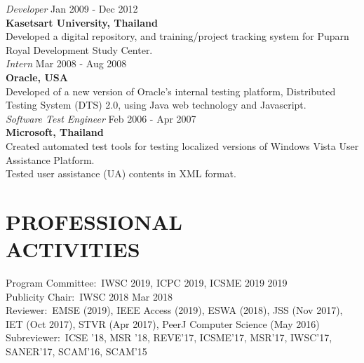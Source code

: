 \documentclass[margin, 10pt]{res} %
\begin{document}
\begin{resume}
{\sl Developer} \hfill Jan 2009 - Dec 2012 \\
\textbf{Kasetsart University, Thailand}\\
Developed a digital repository, and training/project tracking system for Puparn Royal Development Study Center. \vspace{3mm} \\
{\sl Intern} \hfill Mar 2008 - Aug 2008 \\
\textbf{Oracle, USA}\\
Developed of a new version of Oracle's internal testing platform, Distributed  
Testing System (DTS) 2.0, using Java web technology and Javascript. \vspace{3mm} \\
{\sl Software Test Engineer} \hfill Feb 2006 - Apr 2007\\
\textbf{Microsoft, Thailand}\\
Created automated test tools for testing localized versions of Windows Vista User Assistance Platform.\\
Tested user assistance (UA) contents in XML format.




\section{PROFESSIONAL \\ ACTIVITIES} 
Program Committee:~IWSC 2019, ICPC 2019, ICSME 2019 \hfill 2019\\
Publicity Chair:~IWSC 2018 \hfill Mar 2018 \\
Reviewer:~EMSE (2019), IEEE Access (2019), ESWA (2018), JSS (Nov 2017), IET (Oct 2017), STVR (Apr 2017), PeerJ Computer Science (May 2016) \\
Subreviewer:~ICSE '18, MSR '18, REVE'17, ICSME'17, MSR'17, IWSC'17, SANER'17, SCAM'16, SCAM'15


\end{resume}
\end{document}
